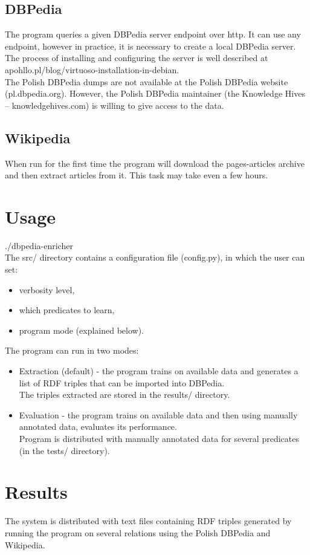 \documentclass[12pt]{article}
\begin{document}
    \subsection{DBPedia}
    The program queries a given DBPedia server endpoint over http. It can use any endpoint, however in practice, it is necessary to create a local DBPedia server.\\
    The process of installing and configuring the server is well described at apohllo.pl/blog/virtuoso-installation-in-debian.\\
    The Polish DBPedia dumps are not available at the Polish DBPedia website (pl.dbpedia.org). However, the Polish DBPedia maintainer (the Knowledge Hives – knowledgehives.com) is willing to give access to the data.\\
    \subsection{Wikipedia}
    When run for the first time the program will download the pages-articles archive and then extract articles from it. This task may take even a few hours.
    \section{Usage}
    ./dbpedia-enricher\\
    The src/ directory contains a configuration file (config.py), in which the user can set:
    \begin{itemize}
        \item verbosity level,
        \item which predicates to learn,
        \item program mode (explained below).
    \end{itemize}
    The program can run in two modes:
    \begin{itemize}
        \item Extraction (default) - the program trains on available data and generates a list of RDF triples that can be imported into DBPedia.\\ The triples extracted are stored in the results/ directory.
        \item Evaluation - the program trains on available data and then using manually annotated data, evaluates its performance. \\Program is distributed with manually annotated data for several predicates (in the tests/ directory).
    \end{itemize}
    
    \section{Results}
    The system is distributed with text files containing RDF triples generated by running the program on several relations using the Polish DBPedia and Wikipedia.
\end{document}
